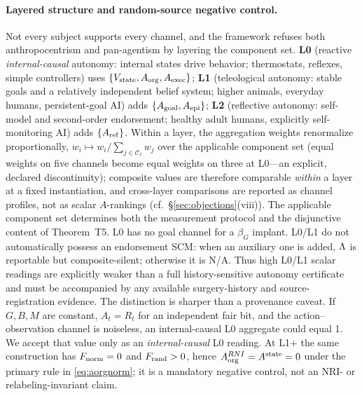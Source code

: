 \paragraph{Layered structure and random-source negative control.} Not every
subject supports every channel, and the framework refuses both
anthropocentrism and pan-agentism by layering the component set. \textbf{L0}
(reactive \emph{internal-causal} autonomy: internal states drive behavior;
thermostats, reflexes, simple controllers) uses $\{V_{\mathrm{state}},A_{\mathrm{org}},A_{\mathrm{exec}}\}$;
\textbf{L1} (teleological autonomy: stable goals and a relatively independent
belief system; higher animals, everyday humans, persistent-goal AI) adds
$\{A_{\mathrm{goal}},A_{\mathrm{epi}}\}$; \textbf{L2} (reflective autonomy: self-model and
second-order endorsement; healthy adult humans, explicitly self-monitoring AI)
adds $\{A_{\mathrm{ref}}\}$. Within a layer, the aggregation weights renormalize
proportionally, $w_i\mapsto w_i/\sum_{j\in\mathcal{C}_\ell}w_j$ over the
applicable component set (equal weights on five channels become equal weights
on three at L0---an explicit, declared discontinuity); composite values are
therefore comparable \emph{within} a layer at a fixed instantiation, and
cross-layer comparisons are reported as channel profiles, not as scalar
$A$-rankings (cf.\ \S\ref{sec:objections}(viii)). The applicable component set determines both the measurement protocol and the
disjunctive content of Theorem~T5. L0 has no goal channel for a $\beta_G$
implant. L0/L1 do not automatically possess an endorsement SCM: when an
auxiliary one is added, $\Lambda$ is reportable but composite-silent; otherwise
it is N/A. Thus high L0/L1 scalar readings are explicitly weaker than a full
history-sensitive autonomy certificate and must be accompanied by any available
surgery-history and source-registration evidence. The distinction is sharper
than a provenance caveat. If $G,B,M$ are constant, $A_t=R_t$ for an independent
fair bit, and the action--observation channel is noiseless, an internal-causal
L0 aggregate could equal 1. We accept that value only as an
\emph{internal-causal} L0
reading. At L1+ the same construction has $F_{\mathrm{norm}}=0$ and $F_{\mathrm{rand}}>0$, hence
$A_{\mathrm{org}}^{RNI}=A^{\mathrm{state}}=0$ under the primary rule in \eqref{eq:aorgnorm}; it is a
mandatory negative control, not an NRI- or relabeling-invariant claim.

